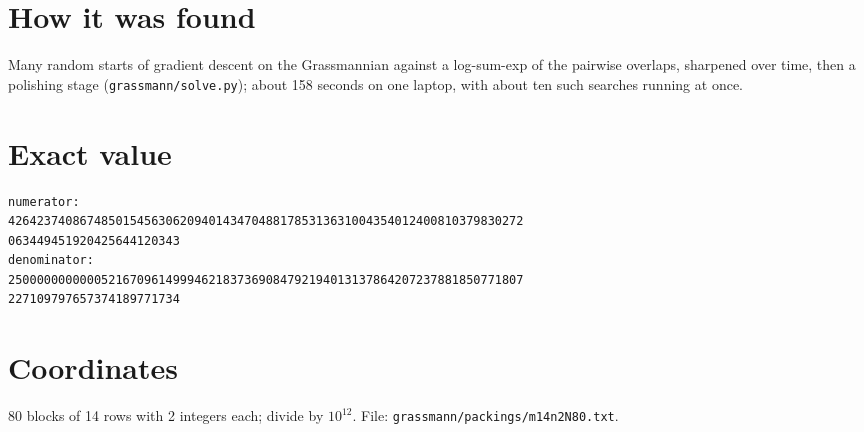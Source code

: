 \documentclass[11pt,a4paper]{article}
\begin{document}
\section{How it was found}
Many random starts of gradient descent on the Grassmannian against a log-sum-exp of the pairwise overlaps, sharpened over time, then a polishing stage (\texttt{grassmann/solve.py}); about 158 seconds on one laptop, with about ten such searches running at once.


\appendix
\section{Exact value}
{\small
\begin{verbatim}
numerator:
426423740867485015456306209401434704881785313631004354012400810379830272
063449451920425644120343
denominator:
250000000000052167096149994621837369084792194013137864207237881850771807
227109797657374189771734
\end{verbatim}}

\section{Coordinates}
80 blocks of 14 rows with 2 integers each; divide by $10^{12}$. File: \texttt{grassmann/packings/m14n2N80.txt}.
{\tiny
\begin{multicols}{4}
\end{multicols}}
\end{document}
